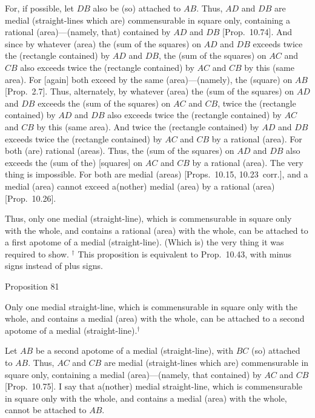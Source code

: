 For, if possible, let $DB$ also be (so) attached to $AB$. Thus, $AD$ and
$DB$ are medial (straight-lines which are) commensurable in square only, containing a rational (area)---(namely, that)
contained by $AD$ and $DB$ [Prop.~10.74]. 
And since by whatever (area)
the (sum of the squares) on $AD$ and $DB$ exceeds twice the
(rectangle contained) by $AD$ and $DB$,  the (sum of the squares)
on $AC$ and $CB$ also exceeds twice the (rectangle contained) by $AC$ and
$CB$ by this (same area). For [again] both exceed by the same (area)---(namely), the (square)
on $AB$ [Prop.~2.7]. Thus, alternately, 
by whatever (area) the (sum of the squares) on $AD$ and 
$DB$ exceeds the (sum of the squares) on $AC$ and $CB$, 
 twice the (rectangle contained) by $AD$ and $DB$
also exceeds twice the (rectangle contained) by $AC$ and $CB$ by this (same area).
And twice the (rectangle contained) by $AD$ and $DB$ exceeds twice the (rectangle contained) by $AC$ and $CB$ by a rational (area). For both
(are) rational (areas). Thus,  the (sum of the squares) on $AD$ and $DB$ also
exceeds the (sum of the) [squares] on $AC$ and $CB$ by a
rational (area). The very thing is impossible. For both are
medial (areas) [Props.~10.15, 10.23~corr.],
and a medial (area) cannot exceed a(nother) medial (area) by a rational
(area) [Prop.~10.26].

Thus, only one medial (straight-line),
which is commensurable in square only with the whole, and
contains a rational (area) with the whole, can be attached
to a first apotome of a medial (straight-line). (Which is) the very thing it was required to
show.
{\footnotesize\noindent$^\dag$ This proposition is equivalent to 
Prop.~10.43, with minus signs instead of
plus signs.}


\begin{center}
{\large Proposition 81}
\end{center}

Only one medial straight-line,
which is commensurable in square only with the whole, and
contains a medial (area) with the whole, can be attached
to a second apotome of a medial (straight-line).$^\dag$

\epsfysize=1.6in 
\centerline{}

Let $AB$ be a second apotome of a medial (straight-line), with $BC$ (so) attached
to $AB$. Thus, $AC$ and $CB$ are medial (straight-lines which
are) commensurable in square only, containing a medial (area)---(namely,
that contained) by $AC$ and $CB$ [Prop.~10.75].
I say that a(nother) medial straight-line, which is commensurable in square
only with the whole, and contains a medial (area) with the whole, cannot
be attached to $AB$.

